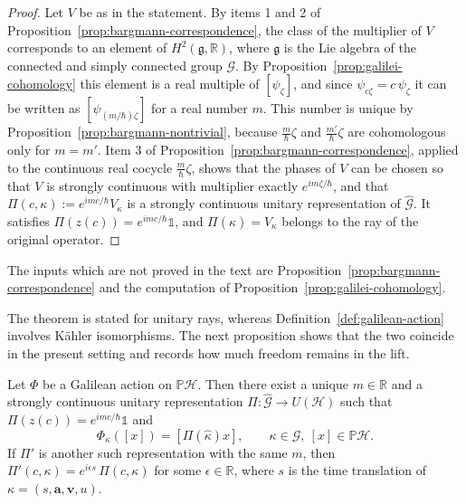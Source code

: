 \begin{proof}
	Let $V$ be as in the statement. By items 1 and 2 of Proposition~\ref{prop:bargmann-correspondence}, the class of the multiplier of $V$ corresponds to an element of $H^2(\mathfrak{g},\mathbb{R})$, where $\mathfrak{g}$ is the Lie algebra of the connected and simply connected group $\mathcal{G}$. By Proposition~\ref{prop:galilei-cohomology} this element is a real multiple of $[\psi_\zeta]$, and since $\psi_{c\zeta}=c\,\psi_\zeta$ it can be written as $[\psi_{(m/\hbar)\zeta}]$ for a real number $m$. This number is unique by Proposition~\ref{prop:bargmann-nontrivial}, because $\frac{m}{\hbar}\zeta$ and $\frac{m'}{\hbar}\zeta$ are cohomologous only for $m=m'$. Item 3 of Proposition~\ref{prop:bargmann-correspondence}, applied to the continuous real cocycle $\frac{m}{\hbar}\zeta$, shows that the phases of $V$ can be chosen so that $V$ is strongly continuous with multiplier exactly $e^{im\zeta/\hbar}$, and that $\Pi(c,\kappa):=e^{imc/\hbar}V_\kappa$ is a strongly continuous unitary representation of $\widehat{\mathcal{G}}$. It satisfies $\Pi(z(c))=e^{imc/\hbar}\mathbb{1}$, and $\Pi(\hat\kappa)=V_\kappa$ belongs to the ray of the original operator.
\end{proof}

\noindent The inputs which are not proved in the text are Proposition~\ref{prop:bargmann-correspondence} and the computation of Proposition~\ref{prop:galilei-cohomology}.

The theorem is stated for unitary rays, whereas Definition~\ref{def:galilean-action} involves Kähler isomorphisms. The next proposition shows that the two coincide in the present setting and records how much freedom remains in the lift.

\begin{proposition}\label{prop:lift}
	Let $\Phi$ be a Galilean action on $\mathbb{P}\mathcal{H}$. Then there exist a unique $m\in\mathbb{R}$ and a strongly continuous unitary representation $\Pi:\widehat{\mathcal{G}}\to U(\mathcal{H})$ such that $\Pi(z(c))=e^{imc/\hbar}\mathbb{1}$ and
	\begin{equation}
		\Phi_\kappa([x])=[\Pi(\hat\kappa)x], \qquad \kappa\in\mathcal{G},\ [x]\in\mathbb{P}\mathcal{H}.
		\label{eq:lift}
	\end{equation}
	If $\Pi'$ is another such representation with the same $m$, then $\Pi'(c,\kappa)=e^{i\epsilon s}\,\Pi(c,\kappa)$ for some $\epsilon\in\mathbb{R}$, where $s$ is the time translation of $\kappa=(s,\mathbf{a},\mathbf{v},u)$.
\end{proposition}

